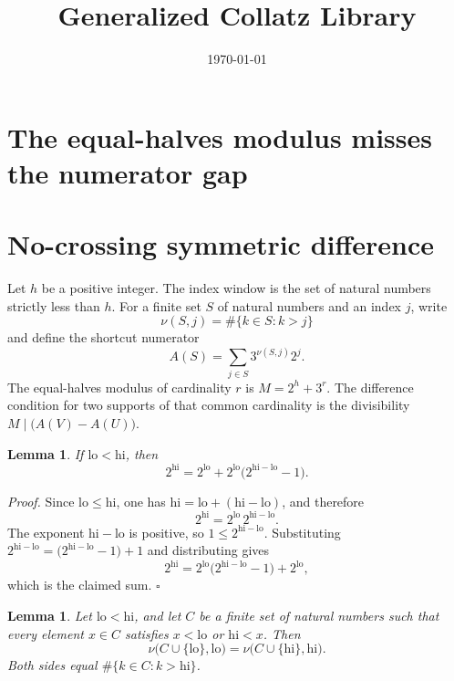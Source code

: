 \documentclass[11pt,letterpaper]{article}
\title{Generalized Collatz Library}
\author{}
\date{\today}
\newtheorem{lemma}[theorem]{Lemma}
\newenvironment{proof}{\noindent\textit{Proof.}}{\hfill\(\square\)}
\begin{document}
\maketitle
\section*{The equal-halves modulus misses the numerator gap}

\section{No-crossing symmetric difference}

Let \(h\) be a positive integer. The index window is the set of natural numbers strictly less than \(h\). For a finite set \(S\) of natural numbers and an index \(j\), write
\[
\nu(S,j)=\#\{k\in S:k>j\}
\]
and define the shortcut numerator
\[
A(S)=\sum_{j\in S}3^{\nu(S,j)}2^{j}.
\]
The equal-halves modulus of cardinality \(r\) is \(M=2^{h}+3^{r}\). The difference condition for two supports of that common cardinality is the divisibility \(M\mid\bigl(A(V)-A(U)\bigr)\).

\begin{lemma}
\label{lem:power-split}
If \(\mathrm{lo}<\mathrm{hi}\), then
\[
2^{\mathrm{hi}}=2^{\mathrm{lo}}+2^{\mathrm{lo}}\bigl(2^{\mathrm{hi}-\mathrm{lo}}-1\bigr).
\]
\end{lemma}

\begin{proof}
Since \(\mathrm{lo}\le\mathrm{hi}\), one has \(\mathrm{hi}=\mathrm{lo}+(\mathrm{hi}-\mathrm{lo})\), and therefore
\[
2^{\mathrm{hi}}=2^{\mathrm{lo}}\,2^{\mathrm{hi}-\mathrm{lo}}.
\]
The exponent \(\mathrm{hi}-\mathrm{lo}\) is positive, so \(1\le 2^{\mathrm{hi}-\mathrm{lo}}\). Substituting \(2^{\mathrm{hi}-\mathrm{lo}}=\bigl(2^{\mathrm{hi}-\mathrm{lo}}-1\bigr)+1\) and distributing gives
\[
2^{\mathrm{hi}}=2^{\mathrm{lo}}\bigl(2^{\mathrm{hi}-\mathrm{lo}}-1\bigr)+2^{\mathrm{lo}},
\]
which is the claimed sum.
\end{proof}

\begin{lemma}
\label{lem:endpoints}
Let \(\mathrm{lo}<\mathrm{hi}\), and let \(C\) be a finite set of natural numbers such that every element \(x\in C\) satisfies \(x<\mathrm{lo}\) or \(\mathrm{hi}<x\). Then
\[
\nu\bigl(C\cup\{\mathrm{lo}\},\mathrm{lo}\bigr)=\nu\bigl(C\cup\{\mathrm{hi}\},\mathrm{hi}\bigr).
\]
Both sides equal \(\#\{k\in C:k>\mathrm{hi}\}\).
\end{lemma}
\end{document}
